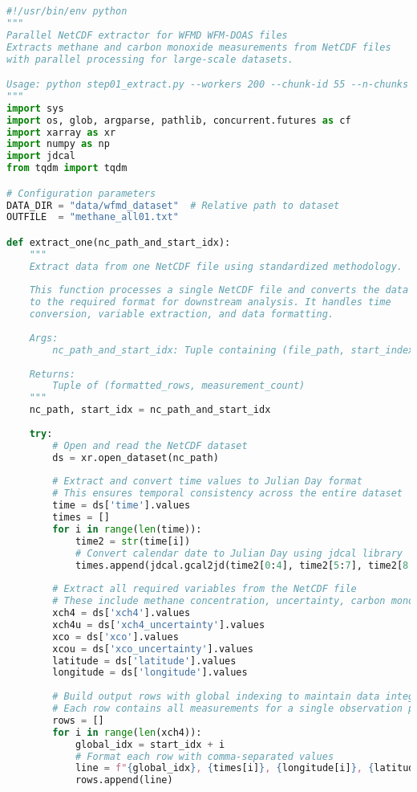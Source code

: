 \begin{lstlisting}[language=Python, caption=Parallel NetCDF Data Extraction Algorithm, label=alg:step01_extract]
#!/usr/bin/env python
"""
Parallel NetCDF extractor for WFMD WFM-DOAS files
Extracts methane and carbon monoxide measurements from NetCDF files
with parallel processing for large-scale datasets.

Usage: python step01_extract.py --workers 200 --chunk-id 55 --n-chunks 100
"""
import sys
import os, glob, argparse, pathlib, concurrent.futures as cf
import xarray as xr
import numpy as np
import jdcal
from tqdm import tqdm

# Configuration parameters
DATA_DIR = "data/wfmd_dataset"  # Relative path to dataset
OUTFILE  = "methane_all01.txt"

def extract_one(nc_path_and_start_idx):
    """
    Extract data from one NetCDF file using standardized methodology.
    
    This function processes a single NetCDF file and converts the data
    to the required format for downstream analysis. It handles time
    conversion, variable extraction, and data formatting.
    
    Args:
        nc_path_and_start_idx: Tuple containing (file_path, start_index)
        
    Returns:
        Tuple of (formatted_rows, measurement_count)
    """
    nc_path, start_idx = nc_path_and_start_idx
    
    try:
        # Open and read the NetCDF dataset
        ds = xr.open_dataset(nc_path)
        
        # Extract and convert time values to Julian Day format
        # This ensures temporal consistency across the entire dataset
        time = ds['time'].values
        times = []
        for i in range(len(time)):
            time2 = str(time[i])
            # Convert calendar date to Julian Day using jdcal library
            times.append(jdcal.gcal2jd(time2[0:4], time2[5:7], time2[8:10])[1])
        
        # Extract all required variables from the NetCDF file
        # These include methane concentration, uncertainty, carbon monoxide, and coordinates
        xch4 = ds['xch4'].values
        xch4u = ds['xch4_uncertainty'].values
        xco = ds['xco'].values
        xcou = ds['xco_uncertainty'].values
        latitude = ds['latitude'].values
        longitude = ds['longitude'].values
        
        # Build output rows with global indexing to maintain data integrity
        # Each row contains all measurements for a single observation point
        rows = []
        for i in range(len(xch4)):
            global_idx = start_idx + i
            # Format each row with comma-separated values
            line = f"{global_idx}, {times[i]}, {longitude[i]}, {latitude[i]}, {xch4[i]}, {xch4u[i]}, {xco[i]}, {xcou[i]}\n"
            rows.append(line)
        

\end{lstlisting}

